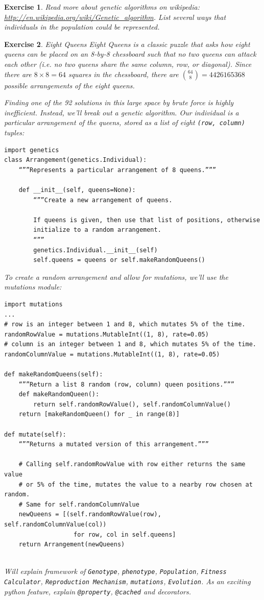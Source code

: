 \documentclass[12pt]{article}
\newtheorem{ex}{Exercise}
\begin{document}
\begin{ex}
Read more about genetic algorithms on wikipedia: \url{http://en.wikipedia.org/wiki/Genetic_algorithm}. List several ways that individuals in the population could be represented.
\end{ex}

\begin{ex} Eight Queens
Eight Queens is a classic puzzle that asks how eight queens can be placed on an 8-by-8 chessboard such that no two queens can attack each other (i.e. no two queens share the same column, row, or diagonal). Since there are $8 \times 8 = 64$ squares in the chessboard, there are ${64 \choose 8} = 4426165368$ possible arrangements of the eight queens. 

Finding one of the 92 solutions in this large space by brute force is highly inefficient. Instead, we’ll break out a genetic algorithm. Our individual is a particular arrangement of the queens, stored as a list of eight \verb|(row, column)| tuples:

\begin{verbatim}
import genetics
class Arrangement(genetics.Individual):
	“””Represents a particular arrangement of 8 queens.”””
	
	def __init__(self, queens=None):
		“””Create a new arrangement of queens.

		If queens is given, then use that list of positions, otherwise
		initialize to a random arrangement.
		“””
		genetics.Individual.__init__(self)
		self.queens = queens or self.makeRandomQueens()
\end{verbatim}

To create a random arrangement and allow for mutations, we’ll use the mutations module:
\begin{verbatim}
import mutations
...
# row is an integer between 1 and 8, which mutates 5% of the time.
randomRowValue = mutations.MutableInt((1, 8), rate=0.05)
# column is an integer between 1 and 8, which mutates 5% of the time.
randomColumnValue = mutations.MutableInt((1, 8), rate=0.05)

def makeRandomQueens(self):
	“””Return a list 8 random (row, column) queen positions.”””
	def makeRandomQueen():
		return self.randomRowValue(), self.randomColumnValue()
	return [makeRandomQueen() for _ in range(8)]

def mutate(self):
	“””Returns a mutated version of this arrangement.”””
	
	# Calling self.randomRowValue with row either returns the same value
	# or 5% of the time, mutates the value to a nearby row chosen at random.
	# Same for self.randomColumnValue
	newQueens = [(self.randomRowValue(row), self.randomColumnValue(col))
                   for row, col in self.queens]
	return Arrangement(newQueens)
		

\end{verbatim}

Will explain framework of \verb|Genotype|, \verb|phenotype|, \verb|Population|, \verb|Fitness Calculator|, \verb|Reproduction Mechanism|, \verb|mutations|, \verb|Evolution|. As an exciting python feature, explain \verb|@property|, \verb|@cached| and decorators.
\end{ex}
\end{document}
